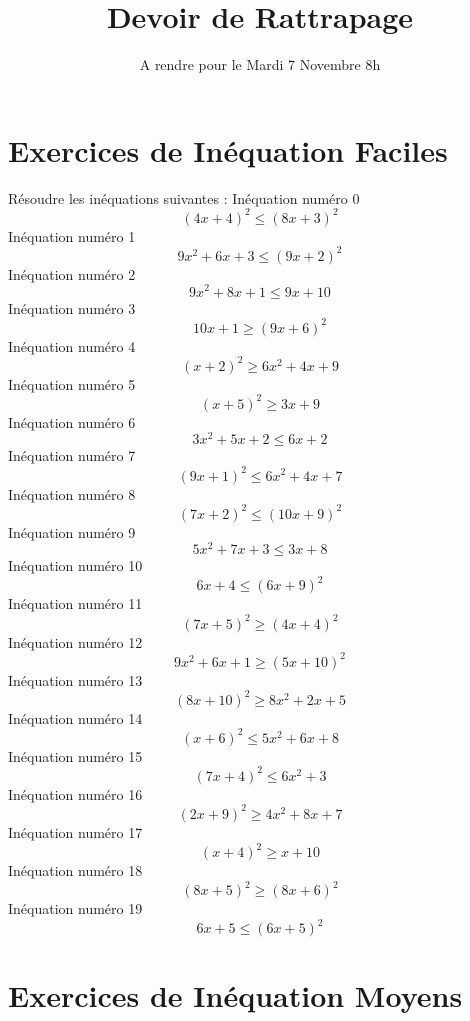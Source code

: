 \documentclass{article}
\title{Devoir de Rattrapage}
\date{A rendre pour le Mardi 7 Novembre 8h}\usepackage{natbib}
\begin{document}
\maketitle
 \section{Exercices de In\'equation Faciles}

 R\'esoudre les in\'equations suivantes : 
In\'equation num\'ero 0 \[\left(4 x + 4\right)^{2} \leq \left(8 x + 3\right)^{2}\]In\'equation num\'ero 1 \[9 x^{2} + 6 x + 3 \leq \left(9 x + 2\right)^{2}\]In\'equation num\'ero 2 \[9 x^{2} + 8 x + 1 \leq 9 x + 10\]In\'equation num\'ero 3 \[10 x + 1 \geq \left(9 x + 6\right)^{2}\]In\'equation num\'ero 4 \[\left(x + 2\right)^{2} \geq 6 x^{2} + 4 x + 9\]In\'equation num\'ero 5 \[\left(x + 5\right)^{2} \geq 3 x + 9\]In\'equation num\'ero 6 \[3 x^{2} + 5 x + 2 \leq 6 x + 2\]In\'equation num\'ero 7 \[\left(9 x + 1\right)^{2} \leq 6 x^{2} + 4 x + 7\]In\'equation num\'ero 8 \[\left(7 x + 2\right)^{2} \leq \left(10 x + 9\right)^{2}\]In\'equation num\'ero 9 \[5 x^{2} + 7 x + 3 \leq 3 x + 8\]In\'equation num\'ero 10 \[6 x + 4 \leq \left(6 x + 9\right)^{2}\]In\'equation num\'ero 11 \[\left(7 x + 5\right)^{2} \geq \left(4 x + 4\right)^{2}\]In\'equation num\'ero 12 \[9 x^{2} + 6 x + 1 \geq \left(5 x + 10\right)^{2}\]In\'equation num\'ero 13 \[\left(8 x + 10\right)^{2} \geq 8 x^{2} + 2 x + 5\]In\'equation num\'ero 14 \[\left(x + 6\right)^{2} \leq 5 x^{2} + 6 x + 8\]In\'equation num\'ero 15 \[\left(7 x + 4\right)^{2} \leq 6 x^{2} + 3\]In\'equation num\'ero 16 \[\left(2 x + 9\right)^{2} \geq 4 x^{2} + 8 x + 7\]In\'equation num\'ero 17 \[\left(x + 4\right)^{2} \geq x + 10\]In\'equation num\'ero 18 \[\left(8 x + 5\right)^{2} \geq \left(8 x + 6\right)^{2}\]In\'equation num\'ero 19 \[6 x + 5 \leq \left(6 x + 5\right)^{2}\]
 \section{Exercices de In\'equation Moyens}
\end{document}
